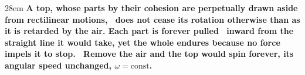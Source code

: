 \documentclass[border=4pt]{standalone}
\begin{document}
\begin{varwidth}{28em}
\large\bfseries
\textcolor{top}{A top}, whose parts by their \textcolor{cohesion}{cohesion} are perpetually drawn aside from rectilinear motions, \     does not cease its rotation otherwise than as it is retarded by \textcolor{air}{the air}. Each part is forever pulled \     inward from the straight line it would take, yet the whole endures because no force impels it to stop. \     Remove the \textcolor{air}{air} and the top would spin forever, its angular speed unchanged, $\omega = \text{const}$.
\end{varwidth}
\end{document}
